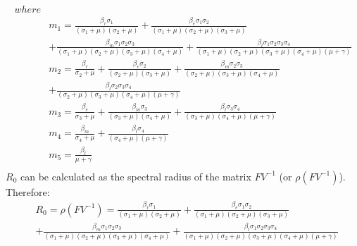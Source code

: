 \begin{align*}
where \\
&m_1 = \frac{\beta_r \sigma_{1}}{{\left(\sigma_{1} + \mu\right)} {\left(\sigma_{2} + \mu\right)}} + \frac{\beta_e \sigma_{1} \sigma_{2}}{{\left(\sigma_{1} + \mu\right)} {\left(\sigma_{2} + \mu\right)} {\left(\sigma_{3} + \mu\right)}} \\ 
&+ \frac{\beta_m \sigma_{1} \sigma_{2} \sigma_{3}}{{\left(\sigma_{1} + \mu\right)} {\left(\sigma_{2} + \mu\right)} {\left(\sigma_{3} + \mu\right)} {\left(\sigma_{4} + \mu\right)}} + \frac{\beta_l \sigma_{1} \sigma_{2} \sigma_{3} \sigma_{4}}{{\left(\sigma_{1} + \mu\right)} {\left(\sigma_{2} + \mu\right)} {\left(\sigma_{3} + \mu\right)} {\left(\sigma_{4} + \mu\right)} {\left(\mu + \gamma\right)}} \\
&m_2= \frac{\beta_r}{\sigma_{2} + \mu} + \frac{\beta_e \sigma_{2}}{{\left(\sigma_{2} + \mu\right)} {\left(\sigma_{3} + \mu\right)}} + \frac{\beta_m \sigma_{2} \sigma_{3}}{{\left(\sigma_{2} + \mu\right)} {\left(\sigma_{3} + \mu\right)} {\left(\sigma_{4} + \mu\right)}} \\ & + \frac{\beta_l \sigma_{2} \sigma_{3} \sigma_{4}}{{\left(\sigma_{2} + \mu\right)} {\left(\sigma_{3} + \mu\right)} {\left(\sigma_{4} + \mu\right)} {\left(\mu + \gamma\right)}} \\
&m_3= \frac{\beta_e}{\sigma_{3} + \mu} + \frac{\beta_m \sigma_{3}}{{\left(\sigma_{3} + \mu\right)} {\left(\sigma_{4} + \mu\right)}} + \frac{\beta_l \sigma_{3} \sigma_{4}}{{\left(\sigma_{3} + \mu\right)} {\left(\sigma_{4} + \mu\right)} {\left(\mu + \gamma\right)}} \\
&m_4= \frac{\beta_m}{\sigma_{4} + \mu} + \frac{\beta_l \sigma_{4}}{{\left(\sigma_{4} + \mu\right)} {\left(\mu + \gamma\right)}} \\
&m_5= \frac{\beta_l}{\mu + \gamma} \\
\end{align*}
$R_0$ can be calculated as the spectral radius of the matrix $FV^{-1}$ (or $\rho(FV^{-1})$). Therefore:
\begin{align*}
&R_0 = \rho(FV^{-1}) = \frac{\beta_r \sigma_{1}}{{\left(\sigma_{1} + \mu\right)} {\left(\sigma_{2} + \mu\right)}} + \frac{\beta_e \sigma_{1} \sigma_{2}}{{\left(\sigma_{1} + \mu\right)} {\left(\sigma_{2} + \mu\right)} {\left(\sigma_{3} + \mu\right)}} \\ 
&+ \frac{\beta_m \sigma_{1} \sigma_{2} \sigma_{3}}{{\left(\sigma_{1} + \mu\right)} {\left(\sigma_{2} + \mu\right)} {\left(\sigma_{3} + \mu\right)} {\left(\sigma_{4} + \mu\right)}} + \frac{\beta_l \sigma_{1} \sigma_{2} \sigma_{3} \sigma_{4}}{{\left(\sigma_{1} + \mu\right)} {\left(\sigma_{2} + \mu\right)} {\left(\sigma_{3} + \mu\right)} {\left(\sigma_{4} + \mu\right)} {\left(\mu + \gamma\right)}}
\end{align*}